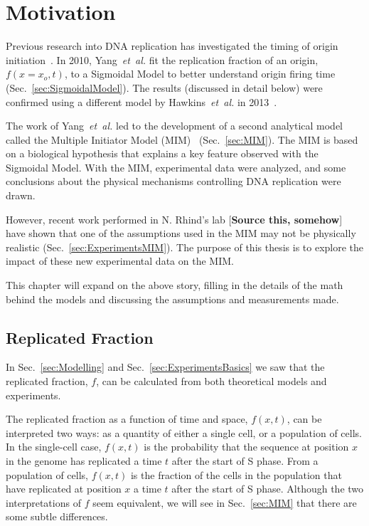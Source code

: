 \chapter{Motivation}
\label{ch:Motivation}

Previous research into DNA replication has investigated the timing of origin initiation~\cite{ScottsPaper,Bechhoefer2012374,deMouraModel1,deMouraModel2,StochasticTermination}.
In 2010, Yang~\emph{et~al.} fit the replication fraction of an origin, $f(x=x_o,t)$, to a Sigmoidal Model to better understand origin firing time~\cite{ScottsPaper} (Sec.~\ref{sec:SigmoidalModel}).
The results (discussed in detail below) were confirmed using a different model by Hawkins~\emph{et~al.} in 2013~\cite{StochasticTermination}.

The work of Yang~\emph{et~al.} led to the development of a second analytical model called the Multiple Initiator Model (MIM)~\cite{ScottsPaper} (Sec.~\ref{sec:MIM}).
The MIM is based on a biological hypothesis that explains a key feature observed with the Sigmoidal Model.
With the MIM, experimental data were analyzed, and some conclusions about the physical mechanisms controlling DNA replication were drawn.

However, recent work performed in N. Rhind's lab [\textbf{Source this, somehow}] have shown that one of the assumptions used in the MIM may not be physically realistic (Sec.~\ref{sec:ExperimentsMIM}).
The purpose of this thesis is to explore the impact of these new experimental data on the MIM.

This chapter will expand on the above story, filling in the details of the math behind the models and discussing the assumptions and measurements made.


	\section{Replicated Fraction}
	\label{sec:ReplicatedFraction}
	
	In Sec.~\ref{sec:Modelling} and Sec.~\ref{sec:ExperimentsBasics} we saw that the replicated fraction, $f$, can be calculated from both theoretical models and experiments.
	
	The replicated fraction as a function of time and space, $f(x,t)$, can be interpreted two ways:
	as a quantity of either a single cell, or a population of cells.
	In the single-cell case, $f(x,t)$ is the probability that the sequence at position $x$ in the genome has replicated a time $t$ after the start of S phase.
	From a population of cells, $f(x,t)$ is the fraction of the cells in the population that have replicated at position $x$ a time $t$ after the start of S phase.
	Although the two interpretations of $f$ seem equivalent, we will see in Sec.~\ref{sec:MIM} that there are some subtle differences.
	
